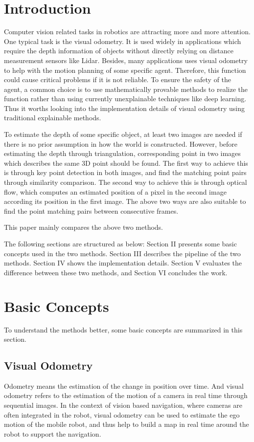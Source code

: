 \documentclass{easychair}
\begin{document}
\section{Introduction}
Computer vision related tasks in robotics are attracting more and more attention. One typical task is the visual odometry. It is used widely in applications which require the depth information of objects without directly relying on distance measurement sensors like Lidar. Besides, many applications uses visual odometry to help with the motion planning of some specific agent. Therefore, this function could cause critical problems if it is not reliable. To ensure the safety of the agent, a common choice is to use mathematically provable methods to realize the function rather than using currently unexplainable techniques like deep learning. Thus it worths looking into the implementation details of visual odometry using traditional explainable methods.

To estimate the depth of some specific object, at least two images are needed if there is no prior assumption in how the world is constructed. However, before estimating the depth through triangulation, corresponding point in two images which describes the same 3D point should be found. The first way to achieve this is through key point detection in both images, and find the matching point pairs through similarity comparison. The second way to achieve this is through optical flow, which computes an estimated position of a pixel in the second image according its position in the first image. The above two ways are also suitable to find the point matching pairs between consecutive frames. 

This paper mainly compares the above two methods. 

The following sections are structured as below: Section II presents some basic concepts used in the two methods. Section III describes the pipeline of the two methods. Section IV shows the implementation details. Section V evaluates the difference between these two methods, and Section VI concludes the work.


\section{Basic Concepts}
To understand the methods better, some basic concepts are summarized in this section.

\subsection{Visual Odometry}
Odometry means the estimation of the change in position over time. And visual odometry refers to the estimation of the motion of a camera in real time through sequential images. In the context of vision based navigation, where cameras are often integrated in the robot, visual odometry can be used to estimate the ego motion of the mobile robot, and thus help to build a map in real time around the robot to support the navigation.
\end{document}
